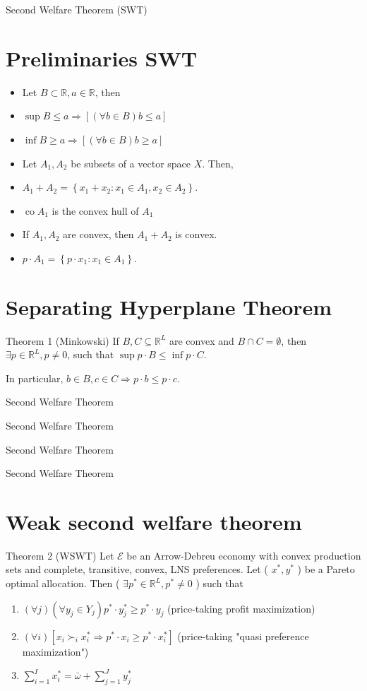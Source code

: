 \documentclass[10pt]{article}
\begin{document}
Second Welfare Theorem (SWT)

\section*{Preliminaries SWT}
\begin{itemize}
  \item Let $B \subset \mathbb{R}, a \in \mathbb{R}$, then
  \item $\sup B \leq a \Longrightarrow[(\forall b \in B) b \leq a]$
  \item $\inf B \geq a \Longrightarrow[(\forall b \in B) b \geq a]$
  \item Let $A_{1}, A_{2}$ be subsets of a vector space $X$. Then,
  \item $A_{1}+A_{2}=\left\{x_{1}+x_{2}: x_{1} \in A_{1}, x_{2} \in A_{2}\right\}$.
  \item $\operatorname{co} A_{1}$ is the convex hull of $A_{1}$
  \item If $A_{1}, A_{2}$ are convex, then $A_{1}+A_{2}$ is convex.
  \item $p \cdot A_{1}=\left\{p \cdot x_{1}: x_{1} \in A_{1}\right\}$.
\end{itemize}

\section*{Separating Hyperplane Theorem}
Theorem 1 (Minkowski) If $B, C \subseteq \mathbb{R}^{L}$ are convex and $B \cap C=\emptyset$, then $\exists p \in \mathbb{R}^{L}, p \neq 0$, such that $\sup p \cdot B \leq \inf p \cdot C$.

In particular, $b \in B, c \in C \Longrightarrow p \cdot b \leq p \cdot c$.

Second Welfare Theorem

Second Welfare Theorem

Second Welfare Theorem

Second Welfare Theorem

\section*{Weak second welfare theorem}
Theorem 2 (WSWT) Let $\mathcal{E}$ be an Arrow-Debreu economy with convex production sets and complete, transitive, convex, LNS preferences. Let ( $x^{*}, y^{*}$ ) be a Pareto optimal allocation. Then ( $\exists p^{*} \in \mathbb{R}^{L}, p^{*} \neq 0$ ) such that

\begin{enumerate}
  \item $(\forall j)\left(\forall y_{j} \in Y_{j}\right) p^{*} \cdot y_{j}^{*} \geq p^{*} \cdot y_{j}$ (price-taking profit maximization)
  \item $(\forall i)\left[x_{i} \succ_{i} x_{i}^{*} \Longrightarrow p^{*} \cdot x_{i} \geq p^{*} \cdot x_{i}^{*}\right]$ (price-taking "quasi preference maximization")
  \item $\sum_{i=1}^{I} x_{i}^{*}=\bar{\omega}+\sum_{j=1}^{J} y_{j}^{*}$
\end{enumerate}
\end{document}
